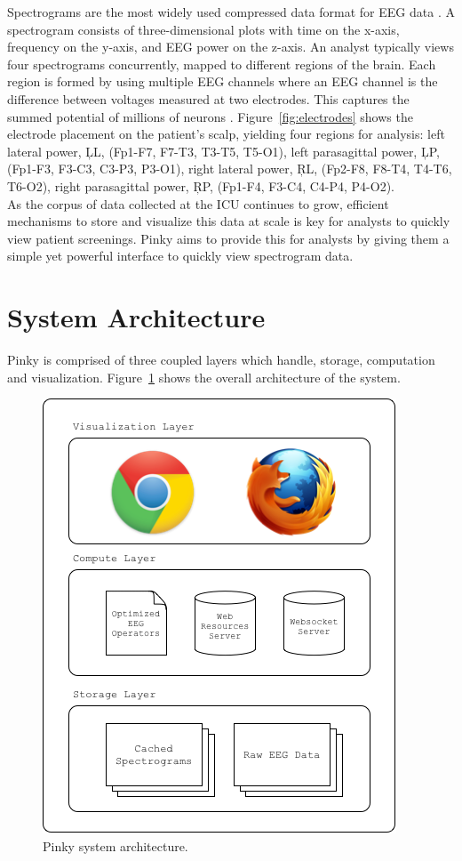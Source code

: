 Spectrograms are the most widely used compressed data format for EEG data
\cite{ceeg-1}. A spectrogram consists of three-dimensional plots with time on
the x-axis, frequency on the y-axis, and EEG power on the z-axis. An analyst
typically views four spectrograms concurrently, mapped to different regions of
the brain. Each region is formed by using multiple EEG channels where an EEG
channel is the difference between voltages measured at two electrodes. This
captures the summed potential of millions of neurons \cite{eeg-ml}.
Figure~\ref{fig:electrodes} shows the electrode placement on the patient's
scalp, yielding four regions for analysis: left lateral power, \c{LL}, (Fp1-F7,
F7-T3, T3-T5, T5-O1), left parasagittal power, \c{LP}, (Fp1-F3, F3-C3, C3-P3,
P3-O1), right lateral power, \c{RL}, (Fp2-F8, F8-T4, T4-T6, T6-O2), right
parasagittal power, \c{RP}, (Fp1-F4, F3-C4, C4-P4, P4-O2).  \\

As the corpus of data collected at the ICU continues to grow, efficient
mechanisms to store and visualize this data at scale is key for analysts to
quickly view patient screenings. Pinky aims to provide this for analysts by
giving them a simple yet powerful interface to quickly view spectrogram data.

\section{System Architecture}

Pinky is comprised of three coupled layers which handle, storage, computation
and visualization. Figure~\ref{fig:system-architecture} shows the overall
architecture of the system.

\begin{figure}[h]
\begin{center}
\includegraphics[scale=0.75]{./img/system-architecture.png}
\caption{Pinky system architecture.}
\label{fig:system-architecture}
\end{center}
\end{figure}


